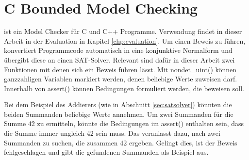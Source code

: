 \section{C Bounded Model Checking}
\label{sec:cbmc}

 ist ein Model Checker für C und C++ Programme. Verwendung findet  in dieser Arbeit in der Evaluation in Kapitel \ref{chp:evaluation}.
Um einen Beweis zu führen, konvertiert  Programmcode automatisch in eine konjunktive Normalform und übergibt diese an einen SAT-Solver.
Relevant sind dafür in dieser Arbeit zwei Funktionen mit denen sich ein Beweis führen lässt. Mit nondet\_uint() können ganzzahligen Variablen markiert
werden, denen  beliebige Werte zuweisen darf. Innerhalb von assert() können Bedingungen formuliert werden, die  beweisen soll.

Bei dem Beispiel des Addierers (wie in Abschnitt \ref{sec:satsolver}) könnten die beiden Summanden beliebige Werte annehmen. Um zwei Summanden für die
Summe 42 zu ermitteln, könnte die Bedingungen im assert() enthalten sein, dass die Summe immer ungleich 42 sein muss. Das veranlasst  dazu, nach
zwei Summanden zu suchen, die zusammen 42 ergeben. Gelingt dies, ist der Beweis fehlgeschlagen und  gibt die gefundenen Summanden als Beispiel aus.